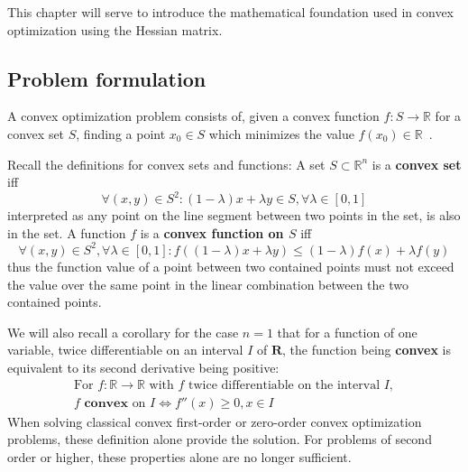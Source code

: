 \documentclass[../convex_optimization.tex]{subfiles}
\theoremstyle{definition} \newtheorem{defi}{Def}
\theoremstyle{definition} \newtheorem{prop}{Prop}
\begin{document}
This chapter will serve to introduce the mathematical foundation used in
convex optimization using the Hessian matrix.

\subsection{Problem formulation}
A convex optimization problem consists of, given a convex function
$f: S \to \mathbb R$ for a convex set $S$, finding
a point $x_0 \in S$ which minimizes the value $f(x_0) \in \mathbb R$~\cite{toulouse}.

Recall the definitions for convex sets and functions:
A set $S \subset \mathbb R^n$ is a \textbf{convex set} iff
\begin{equation}
    \forall (x, y) \in S^2: (1-\lambda)x + \lambda y \in S,
    \forall \lambda \in [0, 1]
    \label{convex_set}
\end{equation}
interpreted as any point on the line segment between two points in the set,
is also in the set.
A function $f$ is a \textbf{convex function on $S$} iff
\begin{equation}
    \forall (x, y) \in S^2, \forall \lambda \in [0, 1]:
    f((1-\lambda)x + \lambda y) \leq (1-\lambda)f(x) + \lambda f(y)
    \label{convex_function}
\end{equation}
thus the function value of a point between two contained points must
not exceed the value over the same point in the linear combination between the two contained points.

We will also recall a corollary for the case $n=1$ 
that for a function of one variable,
twice differentiable on an interval $I$ of $\mathbf R$,
the function being \textbf{convex} is equivalent to its second derivative
being positive:
\begin{equation} \label{convex_corollary}
\begin{gathered}
    \text{For } f: \mathbb R \to \mathbb R
    \text{ with $f$ twice differentiable on the interval $I$}, \\
f \textbf{ convex}\text{ on } I \iff f''(x) \geq 0, x \in I
\end{gathered}
\end{equation}
When solving classical convex first-order or zero-order convex
optimization problems, these definition alone provide the solution.
For problems of second order or higher, these properties alone are
no longer sufficient.
\end{document}

